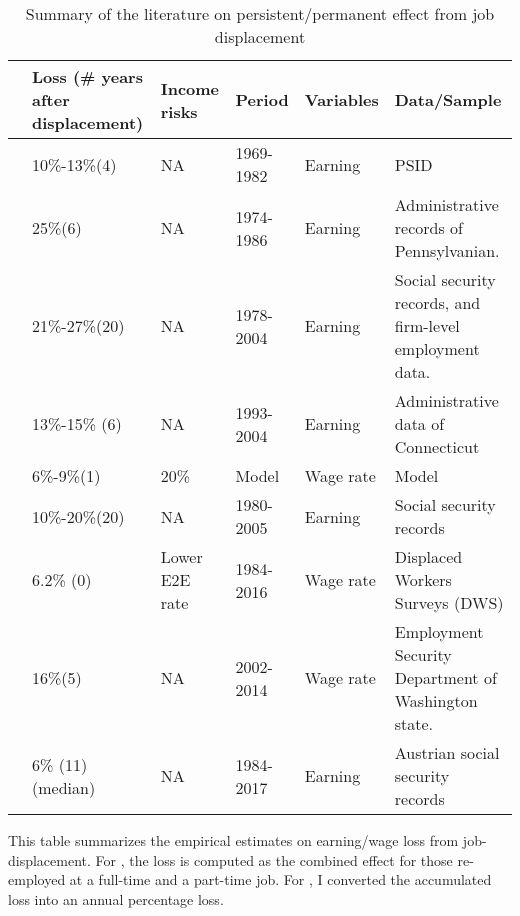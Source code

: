 	\begin{sidewaystable}[p]
\centering
\begin{adjustbox}{width={\textwidth}}
\begin{threeparttable}
\caption{Summary of the literature on persistent/permanent effect from job displacement}
\label{tab:scarring_literature}
\begin{tabular}{llllll}
\hline

                              & Loss (# years after displacement) & Income risks   & Period     & Variables & Data/Sample                                              \\
\hline
 

\cite{ruhm1991workers}        & 10\%-13\%(4)                      & NA             & 1969-1982  & Earning   & PSID                                                     \\
\cite{jacobson1993earnings}   & 25\%(6)                           & NA             & 1974-1986  & Earning   & Administrative records of Pennsylvanian.                 \\
\cite{von2009long}            & 21\%-27\%(20)                     & NA             & 1978-2004  & Earning   & Social security records, and firm-level employment data. \\
\cite{couch2010earnings}      & 13\%-15\% (6)                     & NA             & 1993-2004  & Earning   & Administrative data of Connecticut                       \\
\cite{low2010wage}            & 6\%-9\%(1)                        & 20\%             & Model      & Wage rate & Model                                                    \\
\cite{davis2011recessions}    & 10\%-20\%(20)                     & NA             & 1980-2005  & Earning   & Social security records                                  \\
\cite{farber2017employment}   & 6.2\% (0)                         & Lower E2E rate & 1984-2016 & Wage rate & Displaced Workers Surveys (DWS)                          \\
\cite{lachowska2020sources}   & 16\%(5)                           & NA             & 2002-2014  & Wage rate & Employment Security Department of Washington state.      \\
\cite{pytka2021understanding} & 6\% (11) (median)                 & NA             & 1984-2017  & Earning   & Austrian social security records      \\
\hline
\hline

\end{tabular}
	\begin{flushleft}
\item This table summarizes the empirical estimates on earning/wage loss from job-displacement. For \cite{farber2017employment}, the loss is computed as the combined effect for those re-employed at a full-time and a part-time job. For \cite{pytka2021understanding}, I converted the accumulated loss into an annual  percentage loss.  \end{flushleft}
\end{threeparttable}
\end{adjustbox}
	\end{sidewaystable}

